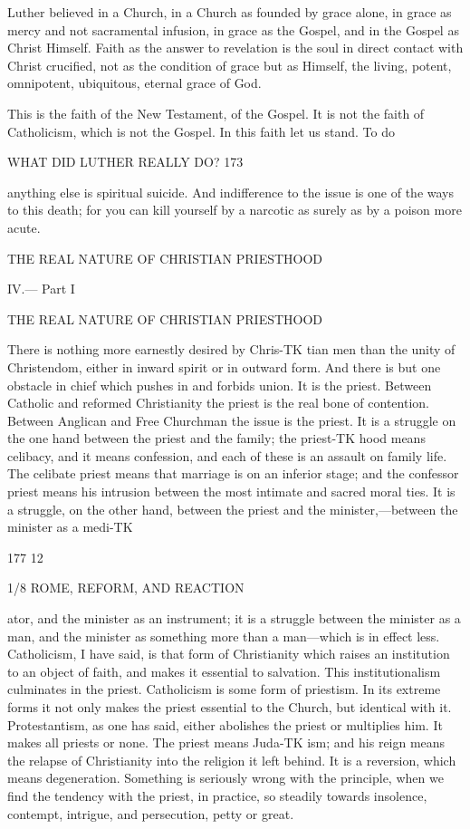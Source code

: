 \documentclass[12pt,a5paper,twoside]{book}
\begin{document}
{Luther believed in a Church, in a Church as founded 
by grace alone, in grace as mercy and not sacramental 
infusion, in grace as the Gospel, and in the Gospel as 
Christ Himself. Faith as the answer to revelation is 
the soul in direct contact with Christ crucified, not 
as the condition of grace but as Himself, the living, 
potent, omnipotent, ubiquitous, eternal grace of God. 

This is the faith of the New Testament, of the 
Gospel. It is not the faith of Catholicism, which is 
not the Gospel. In this faith let us stand. To do 



WHAT DID LUTHER REALLY DO? 173 

anything else is spiritual suicide. And indifference to 
the issue is one of the ways to this death; for you can 
kill yourself by a narcotic as surely as by a poison 
more acute. 



THE REAL NATURE OF CHRISTIAN 
PRIESTHOOD 



IV.— Part I 

THE REAL NATURE OF CHRISTIAN 
PRIESTHOOD 



There is nothing more earnestly desired by Chris-TK
tian men than the unity of Christendom, either in 
inward spirit or in outward form. And there is but 
one obstacle in chief which pushes in and forbids 
union. It is the priest. Between Catholic and 
reformed Christianity the priest is the real bone of 
contention. Between Anglican and Free Churchman 
the issue is the priest. It is a struggle on the one 
hand between the priest and the family; the priest-TK
hood means celibacy, and it means confession, and 
each of these is an assault on family life. The celibate 
priest means that marriage is on an inferior stage; 
and the confessor priest means his intrusion between 
the most intimate and sacred moral ties. It is a 
struggle, on the other hand, between the priest and 
the minister,---between the minister as a medi-TK

177 12 



1/8 ROME, REFORM, AND REACTION 

ator, and the minister as an instrument; it is a 
struggle between the minister as a man, and the 
minister as something more than a man---which is 
in effect less. Catholicism, I have said, is that form 
of Christianity which raises an institution to an object 
of faith, and makes it essential to salvation. This 
institutionalism culminates in the priest. Catholicism 
is some form of priestism. In its extreme forms it 
not only makes the priest essential to the Church, 
but identical with it. Protestantism, as one has said, 
either abolishes the priest or multiplies him. It 
makes all priests or none. The priest means Juda-TK
ism; and his reign means the relapse of Christianity 
into the religion it left behind. It is a reversion, 
which means degeneration. Something is seriously 
wrong with the principle, when we find the tendency 
with the priest, in practice, so steadily towards insolence, 
contempt, intrigue, and persecution, petty or great. 

}
\end{document}

